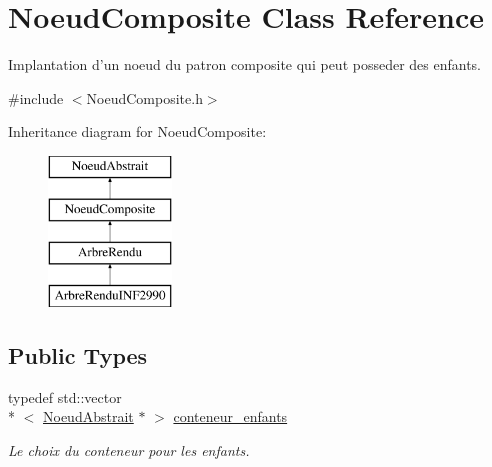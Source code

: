 \hypertarget{class_noeud_composite}{\section{Noeud\-Composite Class Reference}
\label{class_noeud_composite}
}


Implantation d'un noeud du patron composite qui peut posseder des enfants.  




{\ttfamily \#include $<$Noeud\-Composite.\-h$>$}

Inheritance diagram for Noeud\-Composite\-:\begin{figure}[H]
\begin{center}
\leavevmode
\includegraphics[height=4.000000cm]{class_noeud_composite}
\end{center}
\end{figure}
\subsection*{Public Types}
\begin{DoxyCompactItemize}
\item 
\hypertarget{class_noeud_composite_a697e52516e154d6943a1e1aa9533c317}{typedef std\-::vector\\*
$<$ \hyperlink{class_noeud_abstrait}{Noeud\-Abstrait} $\ast$ $>$ \hyperlink{class_noeud_composite_a697e52516e154d6943a1e1aa9533c317}{conteneur\-\_\-enfants}}\label{class_noeud_composite_a697e52516e154d6943a1e1aa9533c317}

\begin{DoxyCompactList}\small\item\em Le choix du conteneur pour les enfants. \end{DoxyCompactList}\end{DoxyCompactItemize}
